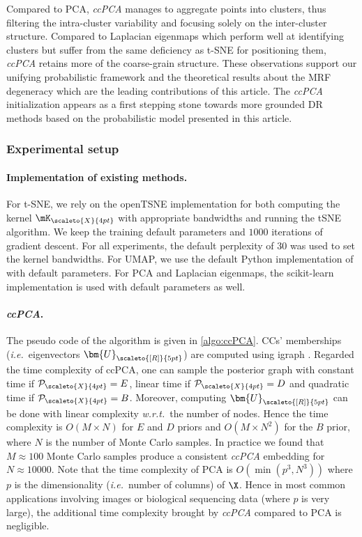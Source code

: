 Compared to PCA, \textit{ccPCA} manages to aggregate points into clusters, thus filtering the intra-cluster variability and focusing solely on the inter-cluster structure. Compared to Laplacian eigenmaps which perform well at identifying clusters but suffer from the same deficiency as t-SNE for positioning them, \textit{ccPCA} retains more of the coarse-grain structure. These observations support our unifying probabilistic framework and the theoretical results about the MRF degeneracy which are the leading contributions of this article. The \textit{ccPCA} initialization appears as a first stepping stone towards more grounded DR methods based on the probabilistic model presented in this article.


\subsubsection{Experimental setup}\label{sec:setup_ccpca}

\paragraph{Implementation of existing methods.} For t-SNE, we rely on the openTSNE implementation \citep{polivcar2019opentsne} for both computing the kernel $\mK_{\scaleto{X}{4pt}}$ with appropriate bandwidths and running the tSNE algorithm. We keep the training default parameters and $1000$ iterations of gradient descent. For all experiments, the default perplexity of $30$ was used to set the kernel bandwidths. For UMAP, we use the default Python implementation of \citep{mcinnes2018umap} with default parameters. For PCA and Laplacian eigenmaps, the scikit-learn implementation is used \citep{pedregosa2011scikit} with default parameters as well. 

\paragraph{\textit{ccPCA}.} The pseudo code of the algorithm is given in \cref{algo:ccPCA}. CCs' memberships (\textit{i.e.}\ eigenvectors $\bm{U}_{\scaleto{[R]}{5pt}}$) are computed using igraph \citep{csardi2006igraph}. Regarded the time complexity of ccPCA, one can sample the posterior graph with constant time if $\mathcal{P}_{\scaleto{X}{4pt}} = E$, linear time if $\mathcal{P}_{\scaleto{X}{4pt}} = D$ and quadratic time if $\mathcal{P}_{\scaleto{X}{4pt}} = B$. Moreover, computing $\bm{U}_{\scaleto{[R]}{5pt}}$ can be done with linear complexity \textit{w.r.t.}\ the number of nodes. Hence the time complexity is $O(M \times N)$ for $E$ and $D$ priors and $O(M \times N^2)$ for the $B$ prior, where $N$ is the number of Monte Carlo samples. In practice we found that $M\approx 100$ Monte Carlo samples produce a consistent \textit{ccPCA} embedding for $N \approx 10000$. Note that the time complexity of PCA is $O(\min(p^3,N^3))$ where $p$ is the dimensionality (\textit{i.e.}\ number of columns) of $\X$. Hence in most common applications involving images or biological sequencing data (where $p$ is very large), the additional time complexity brought by \textit{ccPCA} compared to PCA is negligible.

